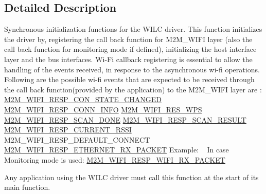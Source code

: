 \subsection{Detailed Description}
Synchronous initialization functions for the W\+I\+LC driver. This function initializes the driver by, registering the call back function for M2\+M\+\_\+\+W\+I\+FI layer (also the call back function for monitoring mode if defined), initializing the host interface layer and the bus interfaces. Wi-\/\+Fi callback registering is essential to allow the handling of the events received, in response to the asynchronous wi-\/fi operations. Following are the possible wi-\/fi events that are expected to be received through the call back function(provided by the application) to the M2\+M\+\_\+\+W\+I\+FI layer are \+: \hyperlink{group__WlanEnums_gga064de09dec1d5e88ed8d075fa40f57deabb42b3025c56c51d915a1fa4abd2dbd0}{M2\+M\+\_\+\+W\+I\+F\+I\+\_\+\+R\+E\+S\+P\+\_\+\+C\+O\+N\+\_\+\+S\+T\+A\+T\+E\+\_\+\+C\+H\+A\+N\+G\+ED} \hyperlink{group__WlanEnums_gga064de09dec1d5e88ed8d075fa40f57dea35767ad0217ab92b149bc77e79610d33}{M2\+M\+\_\+\+W\+I\+F\+I\+\_\+\+R\+E\+S\+P\+\_\+\+C\+O\+N\+N\+\_\+\+I\+N\+FO} \hyperlink{group__WlanEnums_gga064de09dec1d5e88ed8d075fa40f57deaef464d51211d1fc52d818642d666485d}{M2\+M\+\_\+\+W\+I\+F\+I\+\_\+\+R\+E\+S\+\_\+\+W\+PS} \hyperlink{group__WlanEnums_gga064de09dec1d5e88ed8d075fa40f57dead835febbe18b7e3cc6ce4693951354fe}{M2\+M\+\_\+\+W\+I\+F\+I\+\_\+\+R\+E\+S\+P\+\_\+\+S\+C\+A\+N\+\_\+\+D\+O\+NE} \hyperlink{group__WlanEnums_gga064de09dec1d5e88ed8d075fa40f57deadfb48e88c3a8e5f9dac634d62d3f53e5}{M2\+M\+\_\+\+W\+I\+F\+I\+\_\+\+R\+E\+S\+P\+\_\+\+S\+C\+A\+N\+\_\+\+R\+E\+S\+U\+LT} \hyperlink{group__WlanEnums_gga57466b36df595c593e7ccc9892e14b20ae2f28d3ff5c4356502abfc26d8f6e5f1}{M2\+M\+\_\+\+W\+I\+F\+I\+\_\+\+R\+E\+S\+P\+\_\+\+C\+U\+R\+R\+E\+N\+T\+\_\+\+R\+S\+SI} M2\+M\+\_\+\+W\+I\+F\+I\+\_\+\+R\+E\+S\+P\+\_\+\+D\+E\+F\+A\+U\+L\+T\+\_\+\+C\+O\+N\+N\+E\+CT \hyperlink{group__WlanEnums_gga064de09dec1d5e88ed8d075fa40f57dea2d2336ccd8bfda6e083b0ec6b8d798ba}{M2\+M\+\_\+\+W\+I\+F\+I\+\_\+\+R\+E\+S\+P\+\_\+\+E\+T\+H\+E\+R\+N\+E\+T\+\_\+\+R\+X\+\_\+\+P\+A\+C\+K\+ET} Example\+: ~\newline
 In case Monitoring mode is used\+: \hyperlink{group__WlanEnums_gga064de09dec1d5e88ed8d075fa40f57dea9a121b41defa5ffcb174fe304cbce432}{M2\+M\+\_\+\+W\+I\+F\+I\+\_\+\+R\+E\+S\+P\+\_\+\+W\+I\+F\+I\+\_\+\+R\+X\+\_\+\+P\+A\+C\+K\+ET}

Any application using the W\+I\+LC driver must call this function at the start of its main function. 

